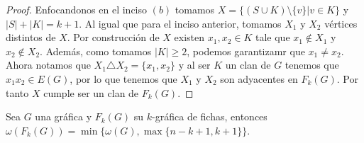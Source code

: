 \begin{proof}
        Enfocandonos en el inciso $(b)$ tomamos $X = \{(S\cup K) \setminus
        \{v\}| v \in K \}$ y $|S| + |K| = k+1$. Al igual que para el inciso
        anterior, tomamos $X_1$ y $X_2$ v\'ertices distintos de $X$. Por
        construcci\'on de $X$ existen $x_1, x_2 \in K$ tale que $x_1 \notin X_1$
        y $x_2 \notin X_2$. Adem\'as, como tomamos $|K| \geq 2$, podemos
        garantizamr que $x_1 \neq x_2$. Ahora notamos que $X_1 \triangle X_2 =
        \{x_1, x_2\}$ y al ser $K$ un clan de $G$ tenemos que $x_1x_2 \in E(G)$,
        por lo que tenemos que $X_1$ y $X_2$ son adyacentes en $F_k(G)$. Por
        tanto $X$ cumple ser un clan de $F_k(G)$.
    \end{proof}

    \begin{teorema}
    \label{teo:clan maximo}
        Sea $G$ una gr\'afica y $F_k(G)$ su $k$-gr\'afica de fichas, entonces
        $\omega(F_k(G))= \min \{\omega(G), \max \{n-k+1,k+1\}\}$.
    \end{teorema}

